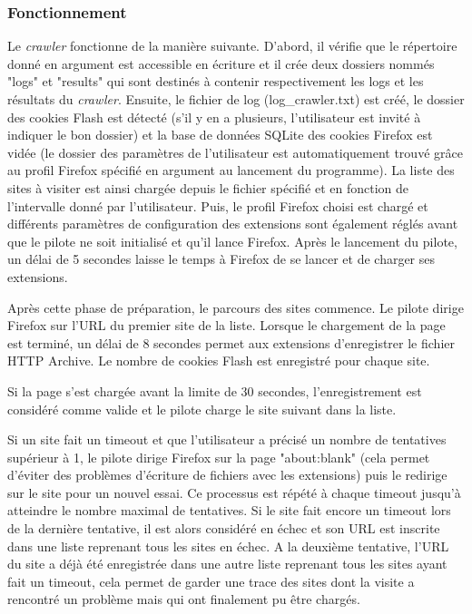 \subsubsection{Fonctionnement}
Le \textit{crawler} fonctionne de la manière suivante. D'abord, il vérifie que le répertoire donné en argument est accessible en écriture et il crée deux dossiers nommés "logs" et "results" qui sont destinés à contenir respectivement les logs et les résultats du \textit{crawler}. Ensuite, le fichier de log (log\_crawler.txt) est créé, le dossier des cookies Flash est détecté (s'il y en a plusieurs, l'utilisateur est invité à indiquer le bon dossier) et la base de données SQLite des cookies Firefox est vidée (le dossier des paramètres de l'utilisateur est automatiquement trouvé grâce au profil Firefox spécifié en argument au lancement du programme). La liste des sites à visiter est ainsi chargée depuis le fichier spécifié et en fonction de l'intervalle donné par l'utilisateur. Puis, le profil Firefox choisi est chargé et différents paramètres de configuration des extensions sont également réglés avant que le pilote ne soit initialisé et qu'il lance Firefox. Après le lancement du pilote, un délai de 5 secondes laisse le temps à Firefox de se lancer et de charger ses extensions.
\newline

Après cette phase de préparation, le parcours des sites commence. Le pilote dirige Firefox sur l'URL du premier site de la liste. Lorsque le chargement de la page est terminé, un délai de 8 secondes permet aux extensions d'enregistrer le fichier HTTP Archive. Le nombre de cookies Flash est enregistré pour chaque site.

Si la page s'est chargée avant la limite de 30 secondes, l'enregistrement est considéré comme valide et le pilote charge le site suivant dans la liste.

Si un site fait un timeout et que l'utilisateur a précisé un nombre de tentatives supérieur à 1, le pilote dirige Firefox sur la page "about:blank" (cela permet d'éviter des problèmes d'écriture de fichiers avec les extensions) puis le redirige sur le site pour un nouvel essai. Ce processus est répété à chaque timeout jusqu'à atteindre le nombre maximal de tentatives. Si le site fait encore un timeout lors de la dernière tentative, il est alors considéré en échec et son URL est inscrite dans une liste reprenant tous les sites en échec. A la deuxième tentative, l'URL du site a déjà été enregistrée dans une autre liste reprenant tous les sites ayant fait un timeout, cela permet de garder une trace des sites dont la visite a rencontré un problème mais qui ont finalement pu être chargés. 

